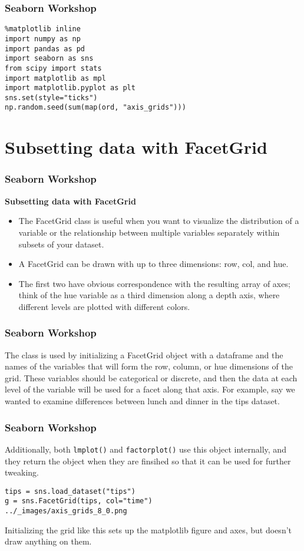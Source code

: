 \begin{frame}[fragile]
\frametitle{Seaborn Workshop}
\large
\begin{verbatim}
%matplotlib inline
import numpy as np
import pandas as pd
import seaborn as sns
from scipy import stats
import matplotlib as mpl
import matplotlib.pyplot as plt
sns.set(style="ticks")
np.random.seed(sum(map(ord, "axis_grids")))
\end{verbatim}

\end{frame}
\section{Subsetting data with FacetGrid}
\begin{frame}[fragile]
\frametitle{Seaborn Workshop}
\large
\noindent \textbf{Subsetting data with FacetGrid}
\begin{itemize}
\item The FacetGrid class is useful when you want to visualize the distribution of a variable or the relationship between multiple variables separately within subsets of your dataset. 
\item A FacetGrid can be drawn with up to three dimensions: row, col, and hue. 
\item The first two have obvious correspondence with the resulting array of axes; think of the hue variable as a third dimension along a depth axis, where different levels are plotted with different colors.
\end{itemize}

\end{frame}
\begin{frame}[fragile]
\frametitle{Seaborn Workshop}
\large
The class is used by initializing a FacetGrid object with a dataframe and the names of the variables that will form the row, column, or hue dimensions of the grid. These variables should be categorical or discrete, and then the data at each level of the variable will be used for a facet along that axis. For example, say we wanted to examine differences between lunch and dinner in the tips dataset.

\end{frame}
\begin{frame}[fragile]
\frametitle{Seaborn Workshop}
\large

Additionally, both \texttt{lmplot()} and \texttt{factorplot()} use this object internally, and they return the object when they are finsihed so that it can be used for further tweaking.
\begin{verbatim}
tips = sns.load_dataset("tips")
g = sns.FacetGrid(tips, col="time")
../_images/axis_grids_8_0.png
\end{verbatim}
Initializing the grid like this sets up the matplotlib figure and axes, but doesn’t draw anything on them.
\end{frame}
